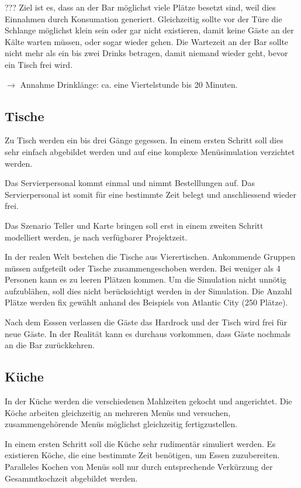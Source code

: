 \documentclass[ngerman,a4paper,12pt]{scrreprt}
\begin{document}
???
Ziel ist es, dass an der Bar möglichst viele Plätze besetzt sind, weil dies Einnahmen durch Konsumation generiert. Gleichzeitig sollte vor der Türe die Schlange möglichst klein sein oder gar nicht existieren, damit keine Gäste an der Kälte warten müssen, oder sogar wieder gehen. Die Wartezeit an der Bar sollte nicht mehr als ein bis zwei Drinks betragen, damit niemand wieder geht, bevor ein Tisch frei wird.

$\rightarrow$ Annahme Drinklänge: ca. eine Viertelstunde bis 20 Minuten.

\subsection{Tische}
Zu Tisch werden ein bis drei Gänge gegessen. In einem ersten Schritt soll dies sehr einfach abgebildet werden und auf eine komplexe Menüsimulation verzichtet werden.

Das Servierpersonal kommt einmal und nimmt Bestelllungen auf. Das Servierpersonal ist somit für eine bestimmte Zeit belegt und anschliessend wieder frei. 

Das Szenario Teller und Karte bringen soll erst in einem zweiten Schritt modelliert werden, je nach verfügbarer Projektzeit.

In der realen Welt bestehen die Tische aus Vierertischen. Ankommende Gruppen müssen aufgeteilt oder Tische zusammengeschoben werden. Bei weniger als 4 Personen kann es zu leeren Plätzen kommen. Um die Simulation nicht unnötig aufzublähen, soll dies nicht berücksichtigt werden in der Simulation.
Die Anzahl Plätze werden fix gewählt anhand des Beispiels von Atlantic City (250 Plätze).

Nach dem Esssen  verlassen die Gäste das Hardrock und der Tisch wird frei für neue Gäste.
In der Realität kann es durchaus vorkommen, dass Gäste nochmals an die Bar zurückkehren.


\subsection{Küche}
	In der Küche werden die verschiedenen Mahlzeiten gekocht und angerichtet. Die Köche arbeiten gleichzeitig an mehreren Menüs und versuchen, zusammengehörende Menüs möglichst gleichzeitig fertigzustellen.

	In einem ersten Schritt soll die Küche sehr rudimentär simuliert werden. Es existieren Köche, die eine bestimmte Zeit benötigen, um Essen zuzubereiten. Paralleles Kochen von Menüs soll nur durch entsprechende Verkürzung der Gesammtkochzeit abgebildet werden.
\end{document}
